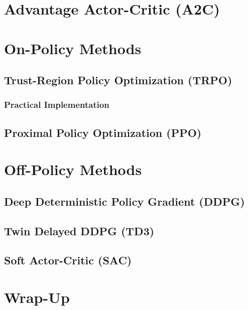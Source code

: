 	\section{Advantage Actor-Critic (A2C)} %

	\section{On-Policy Methods} %

		\subsection{Trust-Region Policy Optimization (TRPO)} %

			\subsubsection{Practical Implementation} %

		\subsection{Proximal Policy Optimization (PPO)} %

	\section{Off-Policy Methods} %

		\subsection{Deep Deterministic Policy Gradient (DDPG)} %

		\subsection{Twin Delayed DDPG (TD3)} %

		\subsection{Soft Actor-Critic (SAC)} %

	\section{Wrap-Up} %

